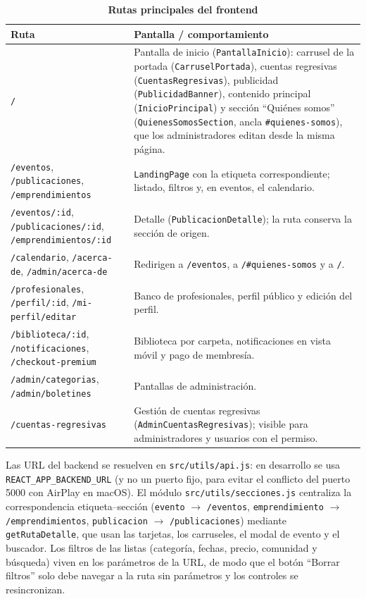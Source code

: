 \begin{table}[H]
\centering
\small
\begin{tabular}{|p{4.6cm}|p{10.2cm}|}
\hline
\textbf{Ruta} & \textbf{Pantalla / comportamiento} \\
\hline
\texttt{/} & Pantalla de inicio (\texttt{PantallaInicio}): carrusel de la portada (\texttt{CarruselPortada}), cuentas regresivas (\texttt{CuentasRegresivas}), publicidad (\texttt{PublicidadBanner}), contenido principal (\texttt{InicioPrincipal}) y sección ``Quiénes somos'' (\texttt{QuienesSomosSection}, ancla \texttt{\#quienes-somos}), que los administradores editan desde la misma página. \\
\hline
\texttt{/eventos}, \texttt{/publicaciones}, \texttt{/emprendimientos} & \texttt{LandingPage} con la etiqueta correspondiente; listado, filtros y, en eventos, el calendario. \\
\hline
\texttt{/eventos/:id}, \texttt{/publicaciones/:id}, \texttt{/emprendimientos/:id} & Detalle (\texttt{PublicacionDetalle}); la ruta conserva la sección de origen. \\
\hline
\texttt{/calendario}, \texttt{/acerca-de}, \texttt{/admin/acerca-de} & Redirigen a \texttt{/eventos}, a \texttt{/\#quienes-somos} y a \texttt{/}. \\
\hline
\texttt{/profesionales}, \texttt{/perfil/:id}, \texttt{/mi-perfil/editar} & Banco de profesionales, perfil público y edición del perfil. \\
\hline
\texttt{/biblioteca/:id}, \texttt{/notificaciones}, \texttt{/checkout-premium} & Biblioteca por carpeta, notificaciones en vista móvil y pago de membresía. \\
\hline
\texttt{/admin/categorias}, \texttt{/admin/boletines} & Pantallas de administración. \\
\hline
\texttt{/cuentas-regresivas} & Gestión de cuentas regresivas (\texttt{AdminCuentasRegresivas}); visible para administradores y usuarios con el permiso. \\
\hline
\end{tabular}
\caption{\textbf{Rutas principales del frontend}}
\label{tab:rutas}
\end{table}

Las URL del backend se resuelven en \texttt{src/utils/api.js}: en desarrollo se usa \texttt{REACT\_APP\_BACKEND\_URL} (y no un puerto fijo, para evitar el conflicto del puerto 5000 con AirPlay en macOS). El módulo \texttt{src/utils/secciones.js} centraliza la correspondencia etiqueta--sección (\texttt{evento} $\rightarrow$ \texttt{/eventos}, \texttt{emprendimiento} $\rightarrow$ \texttt{/emprendimientos}, \texttt{publicacion} $\rightarrow$ \texttt{/publicaciones}) mediante \texttt{getRutaDetalle}, que usan las tarjetas, los carruseles, el modal de evento y el buscador. Los filtros de las listas (categoría, fechas, precio, comunidad y búsqueda) viven en los parámetros de la URL, de modo que el botón ``Borrar filtros'' solo debe navegar a la ruta sin parámetros y los controles se resincronizan.

